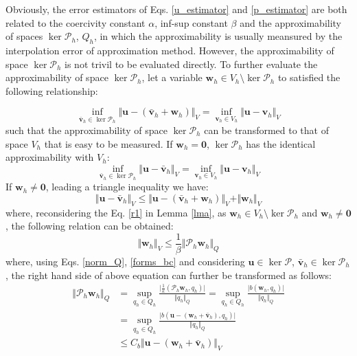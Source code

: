 Obviously,  
the error estimators of Eqs. \eqref{u_estimator} and \eqref{p_estimator} are both related to the coercivity constant $\alpha$, inf-sup constant $\beta$ and the approximability of spaces $\ker \mathcal P_h$, $Q_h$, in which the approximability is usually meansured by the interpolation error of approximation method.
However, the approximability of space $\ker \mathcal P_h$ is not trivil to be evaluated directly.
To further evaluate the approximability of space $\ker \mathcal P_h$, let a variable $\boldsymbol w_h \in V_h \setminus \ker \mathcal P_h$ to satisfied the following relationship:

\begin{equation}
\inf_{\bar{\boldsymbol v}_h \in \ker \mathcal P_h} \Vert \boldsymbol u - (\bar{\boldsymbol v}_h+\boldsymbol w_h) \Vert_V = \inf_{\boldsymbol v_h \in V_h} \Vert \boldsymbol u - \boldsymbol v_h \Vert_V
\end{equation}
such that the approximability of space $\ker \mathcal P_h$ can be transformed to that of space $V_h$ that is easy to be measured.
If $\boldsymbol w_h = \boldsymbol 0$, $\ker \mathcal P_h$ has the identical approximability with $V_h$:
\begin{equation}\label{interp_error_0}
\inf_{\bar{\boldsymbol v}_h \in \ker \mathcal P_h} \Vert \boldsymbol u - \bar{\boldsymbol v}_h \Vert_V = \inf_{\boldsymbol v_h \in V_h} \Vert \boldsymbol u - \boldsymbol v_h \Vert_V
\end{equation}
If $\boldsymbol w_h \neq \boldsymbol 0$, leading a triangle inequality we have:
\begin{equation}\label{kerp_estimator_1}
\Vert \boldsymbol u - \bar{\boldsymbol v}_h \Vert_V \le \Vert \boldsymbol u - (\bar{\boldsymbol v}_h+\boldsymbol w_h) \Vert_V + \Vert \boldsymbol w_h \Vert_V
\end{equation}
where, reconsidering the Eq. \eqref{r1} in Lemma \ref{lma}, as $\boldsymbol w_h \in V_h \setminus \ker \mathcal P_h$ and $\boldsymbol w_h \neq \boldsymbol 0$, the following relation can be obtained:
\begin{equation}\label{kerp_estimator_2}
\Vert \boldsymbol w_h \Vert_V \le \frac{1}{\beta} \Vert \mathcal P_h \boldsymbol w_h \Vert_Q
\end{equation}
where, using Eqs. \eqref{norm_Q}, \eqref{forms_bc} and considering $\boldsymbol u \in \ker \mathcal P$, $\bar{\boldsymbol v}_h \in \ker \mathcal P_h$, the right hand side of above equation can further be transformed as follows:
\begin{equation}\label{kerp_estimator_3}
\begin{split}
\Vert \mathcal P_h \boldsymbol w_h \Vert_Q &= \sup_{q_h \in Q_h} \frac{\vert \frac{1}{\kappa}(\mathcal P_h \boldsymbol w_h, q_h)\vert}{\Vert q_h\Vert_Q} 
= \sup_{q_h \in Q_h} \frac{\vert b(\boldsymbol w_h, q_h)\vert}{\Vert q_h\Vert_Q} \\
&= \sup_{q_h \in Q_h} \frac{\vert b(\boldsymbol u-(\boldsymbol w_h+\bar{\boldsymbol v}_h), q_h)\vert}{\Vert q_h\Vert_Q} \\
&\le C_b \Vert \boldsymbol u - (\boldsymbol w_h + \bar{\boldsymbol v}_h) \Vert_V
\end{split}
\end{equation}
